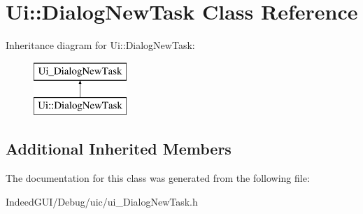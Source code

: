 \hypertarget{class_ui_1_1_dialog_new_task}{}\section{Ui\+:\+:Dialog\+New\+Task Class Reference}
\label{class_ui_1_1_dialog_new_task}
Inheritance diagram for Ui\+:\+:Dialog\+New\+Task\+:\begin{figure}[H]
\begin{center}
\leavevmode
\includegraphics[height=2.000000cm]{class_ui_1_1_dialog_new_task}
\end{center}
\end{figure}
\subsection*{Additional Inherited Members}


The documentation for this class was generated from the following file\+:\begin{DoxyCompactItemize}
\item 
Indeed\+G\+U\+I/\+Debug/uic/ui\+\_\+\+Dialog\+New\+Task.\+h\end{DoxyCompactItemize}
